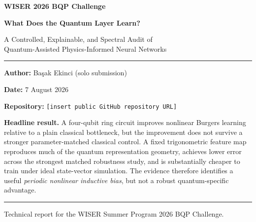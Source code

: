 \documentclass[10pt,a4paper]{article}
\newcommand{\RepositoryURL}{\texttt{[insert public GitHub repository URL]}}
\begin{document}
\hypersetup{pageanchor=false}

\begin{titlepage}
\thispagestyle{empty}
\centering
\vspace*{0.8cm}

{\Large\bfseries\color{wisernavy} WISER 2026 BQP Challenge\par}
\vspace{0.75cm}

{\Huge\bfseries What Does the Quantum Layer Learn?\par}
\vspace{0.28cm}
{\LARGE A Controlled, Explainable, and Spectral Audit of\\Quantum-Assisted Physics-Informed Neural Networks\par}

\vspace{0.95cm}
\rule{0.84\textwidth}{0.7pt}
\vspace{0.50cm}

{\large \textbf{Author:} Başak Ekinci (solo submission)\par}
{\large \textbf{Date:} 7 August 2026\par}
{\large \textbf{Repository:} \RepositoryURL\par}

\vfill

\begin{minipage}{0.90\textwidth}
\small
\textbf{Headline result.} A four-qubit ring circuit improves nonlinear Burgers learning relative to a plain classical bottleneck, but the improvement does not survive a stronger parameter-matched classical control. A fixed trigonometric feature map reproduces much of the quantum representation geometry, achieves lower error across the strongest matched robustness study, and is substantially cheaper to train under ideal state-vector simulation. The evidence therefore identifies a useful \emph{periodic nonlinear inductive bias}, but not a robust quantum-specific advantage.
\end{minipage}

\vspace{0.55cm}
\rule{0.84\textwidth}{0.7pt}
\vspace{0.40cm}

{\small Technical report for the WISER Summer Program 2026 BQP Challenge.\par}
\end{titlepage}
\hypersetup{pageanchor=true}
\end{document}
